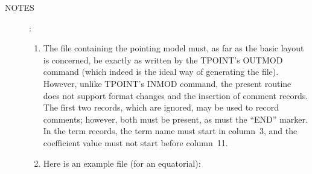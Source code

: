 \documentclass[12pt,fleqn,twoside]{article}
\renewcommand{\_}{{\tt\char'137}}     %
\newcommand{\notes}[1]
{
  \goodbreak
  \begin{description}
    \item[NOTES]: \nopagebreak
        #1
  \end{description}
  \vspace{-3ex}
}
\begin{document}
\notes{
\begin{enumerate}
\setlength{\parskip}{\medskipamount}
\item The file containing the pointing model must, as far as the
      basic layout is concerned, be exactly as
      written by the TPOINT's OUTMOD command
      (which indeed is the ideal way of generating the file).
      However, unlike TPOINT's
      INMOD command, the present routine does not support
      format changes and the insertion of comment records.  The
      first two records, which are ignored, may be used to record
      comments;  however, both must be present, as must the ``END''
      marker.  In the term records, the term name must start in
      column~3, and the coefficient value must not start before
      column~11.
\item Here is an example file (for an equatorial):

      \hspace*{2em}{\tt  AAT~~f/15~~1979/06/11} \\
      \hspace*{2em}{\tt  T~~~49~~~1.1206~~~52.015~~-0.0624} \\
      \hspace*{2em}{\tt  ~~IH~~~~~~~+174.7543~~~~~1.18854} \\
      \hspace*{2em}{\tt  ~=ZH~~~~~~~~~+3.5100} \\
      \hspace*{2em}{\tt  ~~ID~~~~~~~~+23.0464~~~~~0.35693} \\
      \hspace*{2em}{\tt \&=HFX~~~~~~~~+1.0000} \\
      \hspace*{2em}{\tt \&=HFD~~~~~~~~+1.0000} \\
      \hspace*{2em}{\tt \&~HF~~~~~~~~-18.7283~~~~~0.48982} \\
      \hspace*{2em}{\tt \&~X2HC~~~~~~~-3.1122~~~~~0.26477} \\
      \hspace*{2em}{\tt \&~NP~~~~~~~~~+2.9636~~~~~0.79658} \\
      \hspace*{2em}{\tt \&~CH~~~~~~~~-18.6889~~~~~1.20785} \\
      \hspace*{2em}{\tt  ~=ZE~~~~~~~~~+0.7000} \\
      \hspace*{2em}{\tt \&~ME~~~~~~~~+58.2504~~~~~0.43977} \\
      \hspace*{2em}{\tt \&~MA~~~~~~~~~+2.9518~~~~~0.24207} \\
      \hspace*{2em}{\tt  ~~TF~~~~~~~~~+8.9655~~~~~0.54629} \\
      \hspace*{2em}{\tt \&~TFP~~~~~~~~+1.1686~~~~~0.47733} \\
      \hspace*{2em}{\tt  END}


\end{enumerate}}
\end{document}
